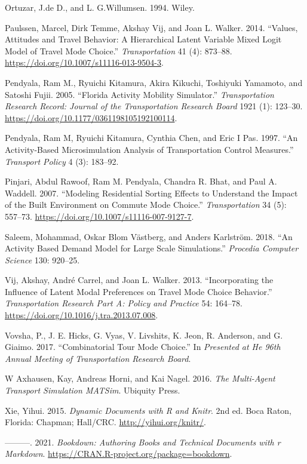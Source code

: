 \documentclass[12pt, oneside, openright]{byuthesis}
\newlength{\cslhangindent}
\newlength{\cslentryspacingunit} %
\newenvironment{CSLReferences}[2] %
 {%
  \setlength{\parindent}{0pt}
  \ifodd #1
  \let\oldpar\par
  \def\par{\hangindent=\cslhangindent\oldpar}
  \fi
  \setlength{\parskip}{#2\cslentryspacingunit}
 }%
 {}
\begin{document}
\begin{CSLReferences}{1}{0}
\leavevmode{}%
Ortuzar, J.de D., and L. G.Willumsen. 1994. Wiley.

\leavevmode{}%
Paulssen, Marcel, Dirk Temme, Akshay Vij, and Joan L. Walker. 2014. {``Values, Attitudes and Travel Behavior: A Hierarchical Latent Variable Mixed Logit Model of Travel Mode Choice.''} \emph{Transportation} 41 (4): 873--88. \url{https://doi.org/10.1007/s11116-013-9504-3}.

\leavevmode{}%
Pendyala, Ram M., Ryuichi Kitamura, Akira Kikuchi, Toshiyuki Yamamoto, and Satoshi Fujii. 2005. {``Florida Activity Mobility Simulator.''} \emph{Transportation Research Record: Journal of the Transportation Research Board} 1921 (1): 123--30. \url{https://doi.org/10.1177/0361198105192100114}.

\leavevmode{}%
Pendyala, Ram M, Ryuichi Kitamura, Cynthia Chen, and Eric I Pas. 1997. {``An Activity-Based Microsimulation Analysis of Transportation Control Measures.''} \emph{Transport Policy} 4 (3): 183--92.

\leavevmode{}%
Pinjari, Abdul Rawoof, Ram M. Pendyala, Chandra R. Bhat, and Paul A. Waddell. 2007. {``Modeling Residential Sorting Effects to Understand the Impact of the Built Environment on Commute Mode Choice.''} \emph{Transportation} 34 (5): 557--73. \url{https://doi.org/10.1007/s11116-007-9127-7}.

\leavevmode{}%
Saleem, Mohammad, Oskar Blom Västberg, and Anders Karlström. 2018. {``An Activity Based Demand Model for Large Scale Simulations.''} \emph{Procedia Computer Science} 130: 920--25.

\leavevmode{}%
Vij, Akshay, André Carrel, and Joan L. Walker. 2013. {``Incorporating the Influence of Latent Modal Preferences on Travel Mode Choice Behavior.''} \emph{Transportation Research Part A: Policy and Practice} 54: 164--78. \url{https://doi.org/10.1016/j.tra.2013.07.008}.

\leavevmode{}%
Vovsha, P., J. E. Hicks, G. Vyas, V. Livshits, K. Jeon, R. Anderson, and G. Giaimo. 2017. {``Combinatorial Tour Mode Choice.''} In \emph{Presented at He 96th Annual Meeting of Transportation Research Board}.

\leavevmode{}%
W Axhausen, Kay, Andreas Horni, and Kai Nagel. 2016. \emph{The Multi-Agent Transport Simulation MATSim}. Ubiquity Press.

\leavevmode{}%
Xie, Yihui. 2015. \emph{Dynamic Documents with {R} and Knitr}. 2nd ed. Boca Raton, Florida: Chapman; Hall/CRC. \url{http://yihui.org/knitr/}.

\leavevmode{}%
---------. 2021. \emph{Bookdown: Authoring Books and Technical Documents with r Markdown}. \url{https://CRAN.R-project.org/package=bookdown}.

\end{CSLReferences}


\end{document}

